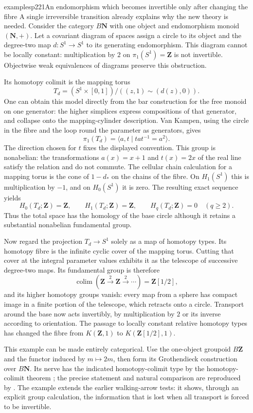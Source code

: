 \begin{dcomment}{examples}{p221}{An endomorphism which becomes invertible only after changing the fibre}
A single irreversible transition already explains why the new theory is needed. Consider the category $B\mathbf N$ with one object and endomorphism monoid $(\mathbf N,+)$. Let a covariant diagram of spaces assign a circle to its object and the degree-two map $d:S^1\to S^1$ to its generating endomorphism. This diagram cannot be locally constant: multiplication by $2$ on $\pi_1(S^1)=\mathbf Z$ is not invertible. Objectwise weak equivalences of diagrams preserve this obstruction.

Its homotopy colimit is the mapping torus
\[
 T_d=(S^1\times[0,1])/((z,1)\sim(d(z),0)).
\]
One can obtain this model directly from the bar construction for the free monoid on one generator: the higher simplices express compositions of that generator, and collapse onto the mapping-cylinder description. Van Kampen, using the circle in the fibre and the loop round the parameter as generators, gives
\[
 \pi_1(T_d)=\langle a,t\mid tat^{-1}=a^2\rangle.
\]
The direction chosen for $t$ fixes the displayed convention. This group is nonabelian: the transformations $a(x)=x+1$ and $t(x)=2x$ of the real line satisfy the relation and do not commute. The cellular chain calculation for a mapping torus is the cone of $1-d_*$ on the chains of the fibre. On $H_1(S^1)$ this is multiplication by $-1$, and on $H_0(S^1)$ it is zero. The resulting exact sequence yields
\[
 H_0(T_d;\mathbf Z)=\mathbf Z,\qquad
 H_1(T_d;\mathbf Z)=\mathbf Z,\qquad H_q(T_d;\mathbf Z)=0\quad(q\geq2).
\]
Thus the total space has the homology of the base circle although it retains a substantial nonabelian fundamental group.

Now regard the projection $T_d\to S^1$ solely as a map of homotopy types. Its homotopy fibre is the infinite cyclic cover of the mapping torus. Cutting that cover at the integral parameter values exhibits it as the telescope of successive degree-two maps. Its fundamental group is therefore
\[
 \mathop{\mathrm{colim}}(\mathbf Z\xrightarrow{2}\mathbf Z\xrightarrow{2}\cdots)
       =\mathbf Z[1/2],
\]
and its higher homotopy groups vanish: every map from a sphere has compact image in a finite portion of the telescope, which retracts onto a circle. Transport around the base now acts invertibly, by multiplication by $2$ or its inverse according to orientation. The passage to locally constant relative homotopy types has changed the fibre from $K(\mathbf Z,1)$ to $K(\mathbf Z[1/2],1)$.

This example can be made entirely categorical. Use the one-object groupoid $B\mathbf Z$ and the functor induced by $m\mapsto2m$, then form its Grothendieck construction over $B\mathbf N$. Its nerve has the indicated homotopy-colimit type by the homotopy-colimit theorem \citep[Theorem 1.2]{Thomason1979}; the precise statement and natural comparison are reproduced by \citet[\S2.3, Theorem 2.6]{Rubin2020Elmendorf}. The example extends the earlier walking-arrow tests: it shows, through an explicit group calculation, the information that is lost when all transport is forced to be invertible.
\end{dcomment}

